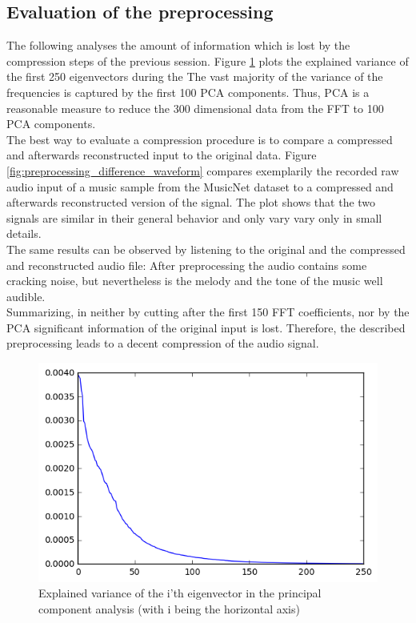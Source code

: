 \documentclass[10pt,conference,compsocconf]{IEEEtran}
\begin{document}
\subsection{Evaluation of the preprocessing}
The following analyses the amount of information which is lost by the compression steps of the previous session. Figure \ref{fig:pca_explained_variance} plots the explained variance of the first 250 eigenvectors during the The vast majority of the variance of the frequencies is captured by the first 100 PCA components. Thus, PCA is a reasonable measure to reduce the 300 dimensional data from the FFT to 100 PCA components.\\
The best way to evaluate a compression procedure is to compare a compressed and afterwards reconstructed input to the original data. Figure \ref{fig:preprocessing_difference_waveform} compares exemplarily the recorded raw audio input of a music sample from the MusicNet dataset to a compressed and afterwards reconstructed version of the signal. The plot shows that the two signals are similar in their general behavior and only vary vary only in small details.\\
The same results can be observed by listening to the original and the compressed and reconstructed audio file: After preprocessing the audio contains some cracking noise, but nevertheless is the melody and the tone of the music well audible.\\
Summarizing, in neither by cutting after the first 150 FFT coefficients, nor by the PCA significant information of the original input is lost. Therefore, the described preprocessing leads to a decent compression of the audio signal.\\
\begin{figure}[htbp]
  \centering
  \includegraphics[width=\columnwidth]{figures/pca_explained_variance}
  \caption{Explained variance of the i'th eigenvector in the principal component analysis (with i being the horizontal axis)}
  \label{fig:pca_explained_variance}
\end{figure}
\end{document}
